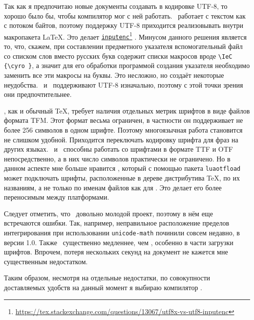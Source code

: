 \documentclass[a4paper,12pt]{article}
\let\orighref=\href
\renewcommand\href[2]{%
  \orighref{#1}{#2}\footnote{\url{#1}}%
}
\begin{document}
Так как я предпочитаю новые документы создавать в кодировке UTF-8, то хорошо было
бы, чтобы компилятор мог с ней работать. \pdfTeX\ работает с текстом как с потоком
байтов, поэтому поддержку UTF-8 приходится реализовывать внутри макропакета \LaTeX.
Это делает \href{https://tex.stackexchange.com/questions/13067/utf8x-vs-utf8-inputenc}{\texttt{inputenc}}.
Минусом данного решения является то, что, скажем,
при составлении предметного указателя вспомогательный файл со списком слов
вместо русских букв содержит списки макросов вроде \verb|\IeC {\cyro }|,
а значит для его обработки программой создания указателя необходимо заменить
все эти макросы на буквы. Это несложно, но создаёт некоторые неудобства.
\XeTeX\ и \LuaTeX\ поддерживают UTF-8 изначально, поэтому с этой точки зрения
они предпочтительнее.

\pdfTeX, как и обычный \TeX, требует наличия отдельных метрик шрифтов в виде
файлов формата TFM. Этот формат весьма ограничен, в частности он поддерживает не
более 256 символов в одном шрифте. Поэтому многоязычная работа становится не
слишком удобной. Приходится переключать кодировку шрифта для фраз на других
языках. \XeTeX\ и \LuaTeX\ способны работать со шрифтами в формате TTF и OTF
непосредственно, а в них число символов практически не ограничено. Но в
данном аспекте мне больше нравится \LuaTeX, который с помощью пакета
\texttt{luaotfload} может подключать шрифты, расположенные в дереве
дистрибутива \TeX, по их названиям, а не только по
именам файлов как для \XeTeX. Это делает его более переносимым между
платформами.

Следует отметить, что \LuaTeX\ довольно молодой проект, поэтому в нём еще
встречаются ошибки. Так, например, неправильное расположение пределов
интегрирования при использовании \texttt{unicode-math} починили совсем недавно,
в версии 1.0. Также \LuaTeX\ существенно медленнее, чем \pdfTeX, особенно в части
загрузки шрифтов. Впрочем, потеря нескольких секунд на документ не кажется мне
существенным недостатком.

Таким образом, несмотря на отдельные недостатки, по совокупности доставляемых
удобств на данный момент я выбираю компилятор \LuaTeX.
\end{document}
